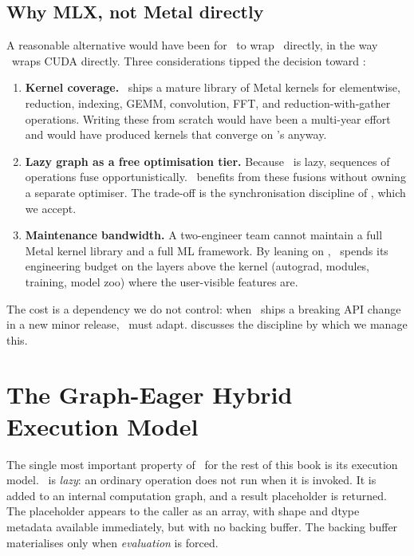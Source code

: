 \subsection{Why MLX, not Metal directly}
\label{ssec:mlx_runtime:why_mlx}

A reasonable alternative would have been for \Lucid\ to wrap \Metal\
directly, in the way \ wraps CUDA directly. Three
considerations tipped the decision toward \MLX:

\begin{enumerate}
  \item \textbf{Kernel coverage.} \MLX\ ships a mature library of
    Metal kernels for elementwise, reduction, indexing, GEMM,
    convolution, FFT, and reduction-with-gather operations. Writing
    these from scratch would have been a multi-year effort and would
    have produced kernels that converge on \MLX's anyway.
  \item \textbf{Lazy graph as a free optimisation tier.} Because
    \MLX\ is lazy, sequences of operations fuse opportunistically.
    \Lucid\ benefits from these fusions without owning a separate
    optimiser. The trade-off is the synchronisation discipline of
    \secref{sec:mlx_runtime:execution}, which we accept.
  \item \textbf{Maintenance bandwidth.} A two-engineer team cannot
    maintain a full Metal kernel library and a full ML framework. By
    leaning on \MLX, \Lucid\ spends its engineering budget on the
    layers above the kernel (autograd, modules, training, model zoo)
    where the user-visible features are.
\end{enumerate}

The cost is a dependency we do not control: when \MLX\ ships a
breaking API change in a new minor release, \Lucid\ must adapt.
 discusses the discipline by
which we manage this.

\section{The Graph-Eager Hybrid Execution Model}
\label{sec:mlx_runtime:execution}

The single most important property of \MLX\ for the rest of this
book is its execution model. \MLX\ is \emph{lazy}: an ordinary
operation does not run when it is invoked. It is added to an internal
computation graph, and a result placeholder is returned. The
placeholder appears to the caller as an array, with shape and dtype
metadata available immediately, but with no backing buffer. The
backing buffer materialises only when \emph{evaluation} is forced.


